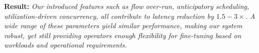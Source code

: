 \textbf{Result:} \emph{Our introduced features such as flow over-run, anticipatory scheduling, utilization-driven concurrency, all contribute to latency reduction by $1.5-3\times$. A wide range of these parameters yield similar performance, making our system robust, yet still providing operators enough flexibility for fine-tuning based on workloads and operational requirements.}

